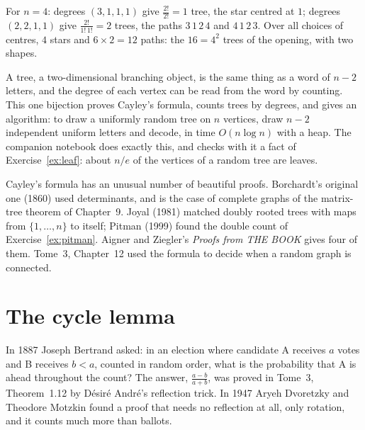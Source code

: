 For $n=4$: degrees $(3,1,1,1)$ give $\frac{2!}{2!}=1$ tree, the star centred at $1$; degrees $(2,2,1,1)$ give $\frac{2!}{1!\,1!}=2$ trees, the paths
$3\,1\,2\,4$ and $4\,1\,2\,3$. Over all choices of centres, $4$ stars and $6\times2=12$ paths: the $16=4^2$ trees of the opening, with two
shapes.

\begin{beauty}
A tree, a two-dimensional branching object, is the same thing as a word of $n-2$ letters, and the degree of each vertex can be
read from the word by counting. This one bijection proves Cayley's formula, counts trees by degrees, and gives an algorithm: to
draw a uniformly random tree on $n$ vertices, draw $n-2$ independent uniform letters and decode, in time $O(n\log n)$ with a heap.
The companion notebook does exactly this, and checks with it a fact of Exercise~\ref{ex:leaf}: about $n/e$ of the vertices of a random
tree are leaves.
\end{beauty}

\begin{remark}
Cayley's formula has an unusual number of beautiful proofs. Borchardt's original one (1860) used determinants, and is the
case of complete graphs of the matrix-tree theorem of Chapter~9. Joyal (1981) matched doubly rooted trees with maps from
$\{1,\dots,n\}$ to itself; Pitman (1999) found the double count of Exercise~\ref{ex:pitman}. Aigner and Ziegler's \emph{Proofs from THE BOOK}
gives four of them. Tome~3, Chapter~12 used the formula to decide when a random graph is connected.
\end{remark}

\section{The cycle lemma}

In 1887 Joseph Bertrand asked: in an election where candidate A receives $a$ votes and B receives $b<a$, counted in random order,
what is the probability that A is ahead throughout the count? The answer, $\frac{a-b}{a+b}$, was proved in Tome~3, Theorem~1.12 by
D\'esir\'e Andr\'e's reflection trick. In 1947 Aryeh Dvoretzky and Theodore Motzkin found a proof that needs no reflection at all,
only rotation, and it counts much more than ballots.


